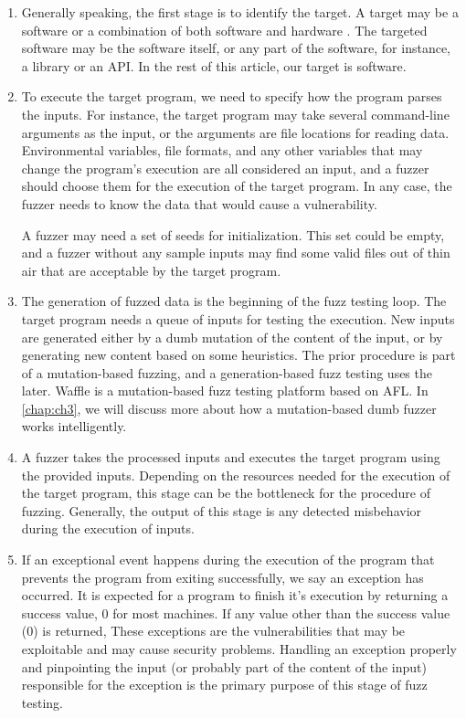 \begin{enumerate}
    \item Generally speaking, the first stage is to identify the target. A target may be a software or a combination of both software and hardware \cite{song2019periscope}. The targeted software may be the software itself, or any part of the software, for instance, a library or an API. In the rest of this article, our target is software.
    
    \item To execute the target program, we need to specify how the program parses the inputs. For instance, the target program may take several command-line arguments as the input, or the arguments are file locations for reading data. Environmental variables, file formats, and any other variables that may change the program's execution are all considered an input, and a fuzzer should choose them for the execution of the target program. In any case, the fuzzer needs to know the data that would cause a vulnerability. 
    
    A fuzzer may need a set of seeds for initialization. This set could be empty, and a fuzzer without any sample inputs may find some valid files out of thin air \cite{out_of_thin_air} that are acceptable by the target program.
    
    \item The generation of fuzzed data is the beginning of the fuzz testing loop. The target program needs a queue of inputs for testing the execution. New inputs are generated either by a dumb mutation of the content of the input, or by generating new content based on some heuristics. The prior procedure is part of a mutation-based fuzzing, and a generation-based fuzz testing uses the later. Waffle is a mutation-based fuzz testing platform based on AFL. In \autoref{chap:ch3}, we will discuss more about how a mutation-based dumb fuzzer works intelligently.

    \item A fuzzer takes the processed inputs and executes the target program using the provided inputs. Depending on the resources needed for the execution of the target program, this stage can be the bottleneck for the procedure of fuzzing. Generally, the output of this stage is any detected misbehavior during the execution of inputs. 
    
    \item If an exceptional event happens during the execution of the program that prevents the program from exiting successfully, we say an exception has occurred. It is expected for a program to finish it's execution by returning a success value, 0 for most machines. If any value other than the success value (0) is returned,  These exceptions are the vulnerabilities that may be exploitable and may cause security problems. Handling an exception properly and pinpointing the input (or probably part of the content of the input) responsible for the exception is the primary purpose of this stage of fuzz testing. 
    

\end{enumerate}
